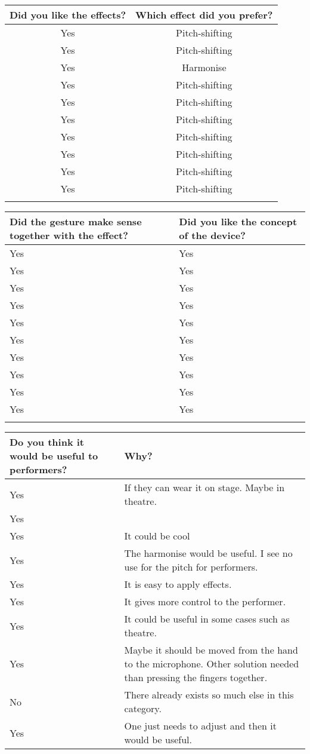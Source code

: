 \begin{center}
\begin{tabular}{| c |  c |}
\hline
Did you like the effects? & Which effect did you prefer? \\ \hline
Yes & Pitch-shifting \\ \hline
Yes & Pitch-shifting \\ \hline
Yes & Harmonise  \\ \hline
Yes & Pitch-shifting \\ \hline
Yes & Pitch-shifting \\ \hline
Yes & Pitch-shifting \\ \hline
Yes & Pitch-shifting \\ \hline
Yes & Pitch-shifting \\ \hline
Yes & Pitch-shifting \\ \hline
Yes & Pitch-shifting \\ \hline\\
\end{tabular}

\begin{tabular}{| p{5cm} | p{5cm} |}
\hline
Did the gesture make sense together with the effect? & Did you like the concept of the device?  \\ \hline
Yes & Yes  \\ \hline
Yes & Yes   \\ \hline
Yes & Yes \\ \hline
Yes & Yes  \\ \hline
Yes & Yes \\ \hline
Yes & Yes  \\ \hline
Yes & Yes  \\ \hline
Yes & Yes  \\ \hline
Yes & Yes \\ \hline
Yes & Yes \\ \hline \\
\end{tabular}

\begin{tabular}{| p{5cm} | p{5cm} |}
\hline
Do you think it would be useful to performers? & Why? \\ \hline
Yes & If they can wear it on stage. Maybe in theatre. \\ \hline
Yes &  \\ \hline
Yes & It could be cool \\ \hline
Yes & The harmonise would be useful. I see no use for the pitch for performers. \\ \hline
Yes & It is easy to apply effects.  \\ \hline
Yes & It gives more control to the performer. \\ \hline
Yes & It could be useful in some cases such as theatre. \\ \hline
Yes & Maybe it should be moved from the hand to the microphone. Other solution needed than pressing the fingers together. \\ \hline
No & There already exists so much else in this category.  \\ \hline
Yes & One just needs to adjust and then it would be useful. \\ \hline
\end{tabular}
\end{center}